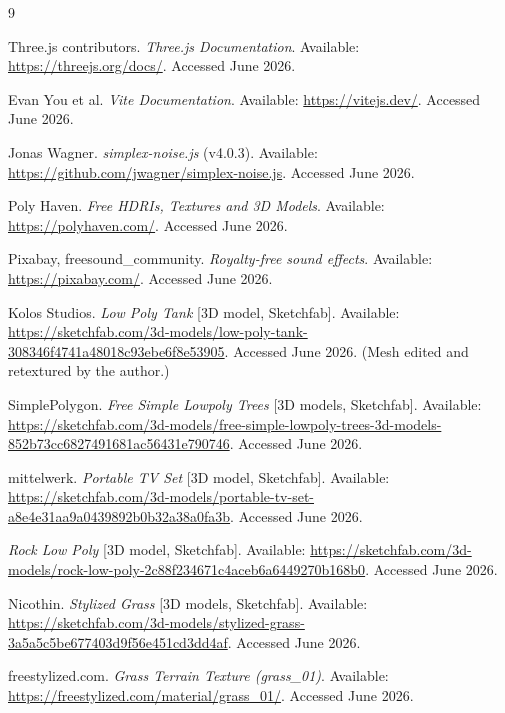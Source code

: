 \documentclass[11pt, a4paper]{article}
\begin{document}
	\FloatBarrier
	\begin{thebibliography}{9}

		Three.js contributors.
		\textit{Three.js Documentation}.
		Available: \url{https://threejs.org/docs/}. Accessed June 2026.

		Evan You et al.
		\textit{Vite Documentation}.
		Available: \url{https://vitejs.dev/}. Accessed June 2026.

		Jonas Wagner.
		\textit{simplex-noise.js} (v4.0.3).
		Available: \url{https://github.com/jwagner/simplex-noise.js}. Accessed June 2026.

		Poly Haven.
		\textit{Free HDRIs, Textures and 3D Models}.
		Available: \url{https://polyhaven.com/}. Accessed June 2026.

		Pixabay, freesound\_community.
		\textit{Royalty-free sound effects}.
		Available: \url{https://pixabay.com/}. Accessed June 2026.

		Kolos Studios.
		\textit{Low Poly Tank} [3D model, Sketchfab].
		Available: \url{https://sketchfab.com/3d-models/low-poly-tank-308346f4741a48018c93ebe6f8e53905}.
		Accessed June 2026. (Mesh edited and retextured by the author.)

		SimplePolygon.
		\textit{Free Simple Lowpoly Trees} [3D models, Sketchfab].
		Available: \url{https://sketchfab.com/3d-models/free-simple-lowpoly-trees-3d-models-852b73cc6827491681ac56431e790746}.
		Accessed June 2026.

		mittelwerk.
		\textit{Portable TV Set} [3D model, Sketchfab].
		Available: \url{https://sketchfab.com/3d-models/portable-tv-set-a8e4e31aa9a0439892b0b32a38a0fa3b}.
		Accessed June 2026.

		\textit{Rock Low Poly} [3D model, Sketchfab].
		Available: \url{https://sketchfab.com/3d-models/rock-low-poly-2c88f234671c4aceb6a6449270b168b0}.
		Accessed June 2026.

		Nicothin.
		\textit{Stylized Grass} [3D models, Sketchfab].
		Available: \url{https://sketchfab.com/3d-models/stylized-grass-3a5a5c5be677403d9f56e451cd3dd4af}.
		Accessed June 2026.

		freestylized.com.
		\textit{Grass Terrain Texture (grass\_01)}.
		Available: \url{https://freestylized.com/material/grass_01/}.
		Accessed June 2026.

	\end{thebibliography}
\end{document}
